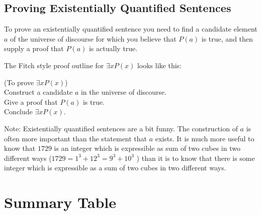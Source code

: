 \subsection{Proving Existentially Quantified Sentences}

To prove an existentially quantified sentence you need to find a candidate element $a$ of the universe of discourse for which you believe that $P(a)$ is true, and then supply a proof that $P(a)$ is actually true.

The Fitch style proof outline for $\exists x P(x)$ looks like this:

\begin{fitch*}
		\textrm{(To prove $\exists x P(x)$)}\\
		\textrm{Construct a candidate $a$ in the universe of discourse.}\\
		\textrm{Give a proof that $P(a)$ is true.}\\
		\textrm{Conclude $\exists x P(x)$.}
\end{fitch*} 

Note:  Existentially quantified sentences are a bit funny.  The construction of $a$ is often more important than the statement that $a$ exists.  It is much more useful to know that $1729$ is an integer which is expressible as sum of two cubes in two different ways ($1729 = 1^3+12^3 = 9^3+10^3$ ) than it is to know that there is some integer which is expressible as a sum of two cubes in two different ways.

 \newpage
 
\section{Summary Table}

